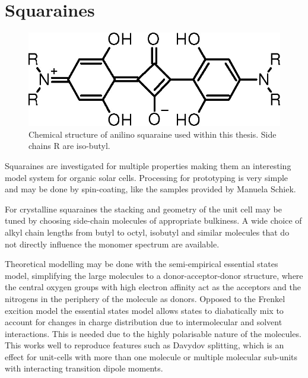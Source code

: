 \documentclass[twoside,openright,listof=numbered]{scrreprt}
\begin{document}
\section{Squaraines}
\begin{figure}[hbtp]
\centering
\includegraphics[width=0.6\linewidth]{images/nAlinoSquaraine.jpeg}
\caption[Chemical structure of anilino squaraine.]{Chemical structure of anilino squaraine used within this thesis. Side chains R are iso-butyl.\label{fig:chemStructureSQIB}}
\end{figure}

Squaraines are investigated for multiple properties making them an interesting model system for organic solar cells. Processing for prototyping is very simple and may be done by spin-coating, like the samples provided by Manuela Schiek.

For crystalline squaraines the stacking and geometry of the unit cell may be tuned by choosing side-chain molecules of appropriate bulkiness. A wide choice of alkyl chain lengths from butyl to octyl, isobutyl and similar molecules that do not directly influence the monomer spectrum are available. \cite{Hestand2015, Brueck2014, Balzer2022} 

Theoretical modelling may be done with the semi-empirical essential states model, simplifying the large molecules to a donor-acceptor-donor structure, where the central oxygen groups with high electron affinity act as the acceptors and the nitrogens in the periphery of the molecule as donors. Opposed to the Frenkel excition model the essential states model allows states to diabatically mix to account for changes in charge distribution due to intermolecular and solvent interactions. This is needed due to the highly polarisable nature of the molecules. This works well to reproduce features such as Davydov splitting, which is an effect for unit-cells with more than one molecule or multiple molecular sub-units with interacting transition dipole moments.\cite{Zhong2019, Hestand2015} 
\end{document}
